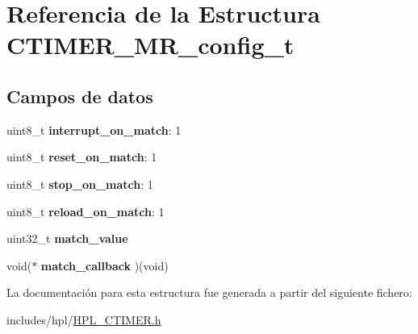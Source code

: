 \hypertarget{structCTIMER__MR__config__t}{}\section{Referencia de la Estructura C\+T\+I\+M\+E\+R\+\_\+\+M\+R\+\_\+config\+\_\+t}
\label{structCTIMER__MR__config__t}
\subsection*{Campos de datos}
\begin{DoxyCompactItemize}
\item 
\mbox{\label{structCTIMER__MR__config__t_a8f2b22e46802a8bd0c877f5aeb5ccb83}} 
uint8\+\_\+t {\bfseries interrupt\+\_\+on\+\_\+match}\+: 1
\item 
\mbox{\label{structCTIMER__MR__config__t_a1b22159a3e2b4a5871621cad85ba75e5}} 
uint8\+\_\+t {\bfseries reset\+\_\+on\+\_\+match}\+: 1
\item 
\mbox{\label{structCTIMER__MR__config__t_a75f85a16f67ae760104e39effde42c7b}} 
uint8\+\_\+t {\bfseries stop\+\_\+on\+\_\+match}\+: 1
\item 
\mbox{\label{structCTIMER__MR__config__t_a7869edc695a5f414c72c5a946e6f0582}} 
uint8\+\_\+t {\bfseries reload\+\_\+on\+\_\+match}\+: 1
\item 
\mbox{\label{structCTIMER__MR__config__t_ae8107a1173a7fc269e873a2d5ef9b630}} 
uint32\+\_\+t {\bfseries match\+\_\+value}
\item 
\mbox{\label{structCTIMER__MR__config__t_a03acc0c1ecc5523c9c8f4329da487a79}} 
void($\ast$ {\bfseries match\+\_\+callback} )(void)
\end{DoxyCompactItemize}


La documentación para esta estructura fue generada a partir del siguiente fichero\+:\begin{DoxyCompactItemize}
\item 
includes/hpl/\hyperlink{HPL__CTIMER_8h}{H\+P\+L\+\_\+\+C\+T\+I\+M\+E\+R.\+h}\end{DoxyCompactItemize}
